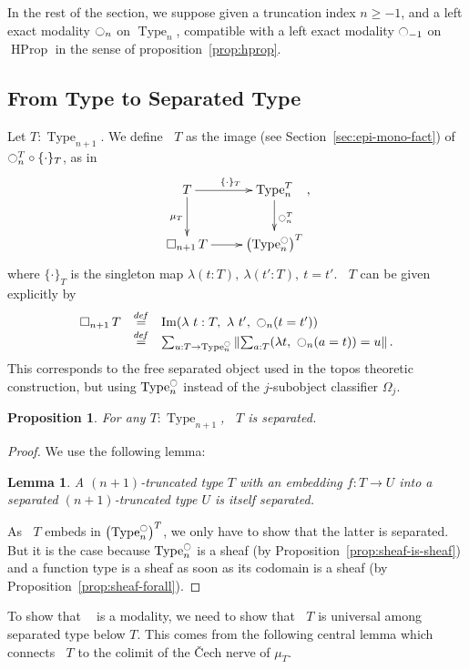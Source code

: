 \documentclass[conference]{IEEEtran}
\newtheorem{prop}[thm]{Proposition}
\newtheorem{lem}[thm]{Lemma}
\newcommand \defeq {\overset{de\hspace{-0.2ex}f}{=}}
\DeclareMathOperator{\Type}{Type}
\DeclareMathOperator{\HProp}{HProp}
\DeclareMathOperator{\im}{Im}
\newcommand{\modal}{\ensuremath{\ocircle}}
\newcommand \separated {\mathop{\square_{n+1}} }
\begin{document}
In the rest of the section, we suppose given a truncation index
$n\geqslant -1$, and a left exact modality $\modal_n$ on $\Type_n$,
compatible with a left exact modality $\modal_{-1}$ on $\HProp$ in the
sense of proposition~\ref{prop:hprop}.

\subsection{From Type to Separated Type}
\label{ssec:from-type-separated}

Let $T : \Type_{n+1}$. We define $\separated T$ as the image (see
Section~\ref{sec:epi-mono-fact}) of
$\modal_n^T \circ \{\cdot\}_T$, as in
$$\xymatrix{
  T \ar[r]^{\{\cdot\}_T} \ar[d]_{\mu_T} & \Type_n^T \ar[d]^{\modal_n^T} \\
  \separated T \ar[r]& \left( \Type_n^\modal \right)^T
}, $$
where $\{\cdot\}_T$ is the singleton map $\lambda (t:T),~\lambda
(t':T),~t=t'$.
%
$\separated T$ can be given explicitly by
%
$$
\begin{array}{rcl}
\separated T &\defeq & \im (\lambda~t:T,~\lambda~ t',~ \modal_n (t = t')) \\
          & \defeq & \sum_{u:T \to \Type_n^\modal} \left\| \sum_{a:T} 
            (\lambda t,~\modal_n (a=t)) = u\right\|.
\end{array}
$$
%
This corresponds to the free separated object used in the topos
theoretic construction, but using $\Type_n^\modal$ instead of the
$j$-subobject classifier $\Omega_j$.
%
\begin{prop}
  For any $T:\Type_{n+1}$, $\separated T$ is separated.  
\end{prop}

\begin{proof}
We use the following lemma:
\begin{lem}
  A $(n+1)$-truncated type $T$ with an embedding $f : T \to U$
  into a separated $(n+1)$-truncated type $U$ is itself separated.
\end{lem}
As $\separated T$ embeds in $\left( \Type_n^\modal \right)^T$, we only
have to show that the latter is separated. But it is the case because
$\Type_n^\modal$ is a sheaf (by Proposition~\ref{prop:sheaf-is-sheaf})
and a function type is a sheaf as soon
as its codomain is a sheaf (by Proposition~\ref{prop:sheaf-forall}).
\end{proof}

To show that $\separated$ is a modality, we need to show that $\separated T$
is universal among separated type below $T$. This comes from the
following central lemma which connects $\separated T$ to the colimit of
the \v{C}ech nerve of $\mu_T$.
\end{document}
